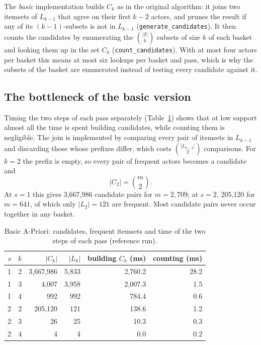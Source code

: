 The \emph{basic} implementation builds $C_k$ as in the original algorithm: it joins two itemsets of $L_{k-1}$ that agree on their first $k - 2$ actors, and prunes the result if any of its $(k-1)$-subsets is not in $L_{k-1}$ (\texttt{generate\_candidates}). It then counts the candidates by enumerating the $\binom{|T|}{k}$ subsets of size $k$ of each basket and looking them up in the set $C_k$ (\texttt{count\_candidates}). With at most four actors per basket this means at most six lookups per basket and pass, which is why the subsets of the basket are enumerated instead of testing every candidate against it.

\subsection{The bottleneck of the basic version}

Timing the two steps of each pass separately (Table~\ref{tab:bottleneck}) shows that at low support almost all the time is spent building candidates, while counting them is negligible. The join is implemented by comparing every pair of itemsets in $L_{k-1}$ and discarding those whose prefixes differ, which costs $\binom{|L_{k-1}|}{2}$ comparisons. For $k = 2$ the prefix is empty, so every pair of frequent actors becomes a candidate and
\[
  |C_2| = \binom{m}{2}.
\]
At $s = 1$ this gives 3{,}667{,}986 candidate pairs for $m = 2{,}709$; at $s = 2$, 205{,}120 for $m = 641$, of which only $|L_2| = 121$ are frequent. Most candidate pairs never occur together in any basket.

\begin{table}[ht]
  \centering
  \caption{Basic A-Priori: candidates, frequent itemsets and time of the two steps of each pass (reference run).}
  \label{tab:bottleneck}
  \begin{tabular}{rrrrrr}
    \toprule
    $s$ & $k$ & $|C_k|$ & $|L_k|$ & building $C_k$ (ms) & counting (ms) \\
    \midrule
    1 & 2 & 3{,}667{,}986 & 5{,}833 & 2{,}760.2 & 28.2 \\
    1 & 3 & 4{,}007 & 3{,}958 & 2{,}007.3 & 1.5 \\
    1 & 4 & 992 & 992 & 784.4 & 0.6 \\
    2 & 2 & 205{,}120 & 121 & 138.6 & 1.2 \\
    2 & 3 & 26 & 25 & 10.3 & 0.3 \\
    2 & 4 & 4 & 4 & 0.0 & 0.2 \\
    \bottomrule
  \end{tabular}
\end{table}

